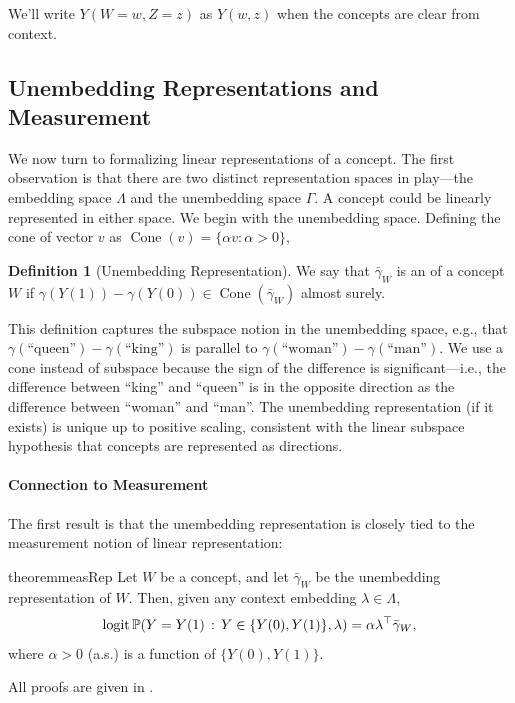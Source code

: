 \documentclass{article}
\theoremstyle{plain}
\theoremstyle{definition}
\newtheorem{definition}[theorem]{Definition}
\theoremstyle{remark}
\DeclareMathOperator{\ConeOp}{Cone}
\newcommand{\Cone}[1]{\ConeOp(#1)}
\begin{document}
We'll write $Y(W=w, Z=z)$ as $Y(w,z)$ when the concepts are clear from context.


\subsection{Unembedding Representations and Measurement}
We now turn to formalizing linear representations of a concept.
The first observation is that there are two distinct representation spaces in play---the embedding space $\Lambda$ and the unembedding space $\Gamma$.
A concept could be linearly represented in either space.
We begin with the unembedding space.
Defining the cone of vector $v$ as $\Cone{v} = \{\alpha v: \alpha > 0\}$,
\begin{definition}[Unembedding Representation]\label{def:unembedding_rep}
    We say that $\bar{\gamma}_W$ is an  of a concept $W$ if $\gamma(Y(1)) - \gamma(Y(0)) \in \Cone{\bar{\gamma}_W}$ almost surely.
\end{definition}
This definition captures the subspace notion in the unembedding space, e.g., that $\gamma(\text{``queen''}) - \gamma(\text{``king''})$ is parallel to $\gamma(\text{``woman''}) - \gamma(\text{``man''})$.
We use a cone instead of subspace because the sign of the difference is significant---i.e., the difference between ``king'' and ``queen'' is in the opposite direction as the difference between ``woman'' and ``man''.
The unembedding representation (if it exists) is unique up to positive scaling, consistent with the linear subspace hypothesis that concepts are represented as directions.

\paragraph{Connection to Measurement}
The first result is that the unembedding representation is closely tied to the measurement notion of linear representation:
\begin{restatable}{theorem}{measRep}\label{thm:measurement}
    Let $W$ be a concept, and let $\bar\gamma_W$ be the unembedding representation of $W$. Then, given any context embedding $\lambda \in \Lambda$,
    \begin{align*}
        \logit \Pr(Y=Y(1) \given Y\in\{Y(0),Y(1)\}, \lambda)
        = \alpha \lambda^\top \bar{\gamma}_W,
    \end{align*}
    where $\alpha > 0$ (a.s.) is a function of $\{Y(0),Y(1)\}$. 
\end{restatable}
All proofs are given in .
\end{document}
